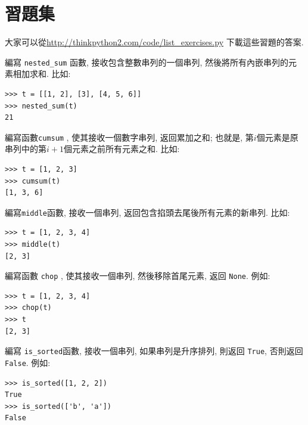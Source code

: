 \documentclass[10pt]{book}
\begin{document}
\section{習題集}

大家可以從\url{http://thinkpython2.com/code/list_exercises.py}
下載這些習題的答案.

\begin{exercise}

編寫 \verb"nested_sum" 函數, 接收包含整數串列的一個串列, 
然後將所有內嵌串列的元素相加求和. 
比如:

\begin{verbatim}
>>> t = [[1, 2], [3], [4, 5, 6]]
>>> nested_sum(t)
21
\end{verbatim}

\end{exercise}

\begin{exercise}
\label{cumulative}
編寫函數{\tt cumsum} , 使其接收一個數字串列, 返回累加之和;
也就是, 第$i$個元素是原串列中的第$i+1$個元素之前所有元素之和. 
比如:

\begin{verbatim}
>>> t = [1, 2, 3]
>>> cumsum(t)
[1, 3, 6]
\end{verbatim}

\end{exercise}

\begin{exercise}

編寫\verb"middle"函數, 接收一個串列, 返回包含掐頭去尾後所有元素的新串列. 
比如:

\begin{verbatim}
>>> t = [1, 2, 3, 4]
>>> middle(t)
[2, 3]
\end{verbatim}

\end{exercise}

\begin{exercise}
編寫函數 \verb"chop" , 使其接收一個串列, 然後移除首尾元素, 返回 {\tt None}.
例如:

\begin{verbatim}
>>> t = [1, 2, 3, 4]
>>> chop(t)
>>> t
[2, 3]
\end{verbatim}

\end{exercise}


\begin{exercise}
編寫 \verb"is_sorted"函數, 接收一個串列, 如果串列是升序排列, 則返回 {\tt True}, 
否則返回 {\tt False}. 例如:

\begin{verbatim}
>>> is_sorted([1, 2, 2])
True
>>> is_sorted(['b', 'a'])
False
\end{verbatim}

\end{exercise}
\end{document}
